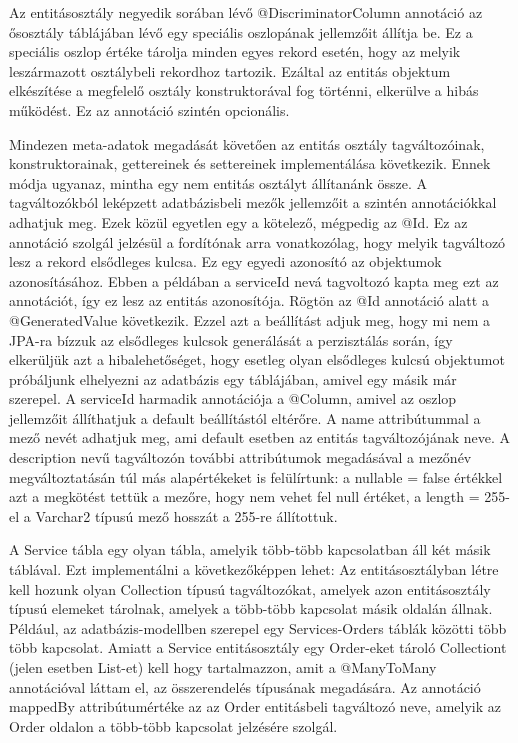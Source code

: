 \documentclass[centeredchapter]{thesis-ekf}
\theoremstyle{definition}
\theoremstyle{remark}
\begin{document}
Az entitásosztály negyedik sorában lévő @DiscriminatorColumn annotáció az ősosztály táblájában lévő egy speciális oszlopának jellemzőit állítja be. Ez a speciális oszlop értéke tárolja minden egyes rekord esetén, hogy az melyik leszármazott osztálybeli rekordhoz tartozik. Ezáltal az entitás objektum elkészítése a megfelelő osztály konstruktorával fog történni, elkerülve a hibás működést.
Ez az annotáció szintén opcionális.

Mindezen meta-adatok megadását követően az entitás osztály tagváltozóinak, konstruktorainak,  gettereinek és settereinek implementálása következik. Ennek módja ugyanaz, mintha egy nem entitás osztályt állítanánk össze. A tagváltozókból leképzett adatbázisbeli mezők jellemzőit a szintén annotációkkal adhatjuk meg. Ezek közül egyetlen egy a kötelező, mégpedig az @Id. Ez az annotáció szolgál jelzésül a fordítónak arra vonatkozólag, hogy melyik tagváltozó lesz a rekord elsődleges kulcsa. Ez egy egyedi azonosító az objektumok azonosításához. Ebben a példában a serviceId nevá tagvoltozó kapta meg ezt az annotációt, így ez lesz az entitás azonosítója. Rögtön az @Id annotáció alatt a @GeneratedValue következik. Ezzel azt a beállítást adjuk meg, hogy mi nem a JPA-ra bízzuk az elsődleges kulcsok generálását a perzisztálás során, így elkerüljük azt a hibalehetőséget, hogy esetleg olyan elsődleges kulcsú objektumot próbáljunk elhelyezni az adatbázis egy táblájában, amivel egy másik már szerepel. A serviceId harmadik annotációja a @Column, amivel az oszlop jellemzőit állíthatjuk a default beállítástól eltérőre. A name attribútummal a mező nevét adhatjuk meg, ami default esetben az entitás tagváltozójának neve. A description nevű tagváltozón további attribútumok megadásával a mezőnév megváltoztatásán túl más alapértékeket is felülírtunk: a nullable = false értékkel azt a megkötést tettük a mezőre, hogy nem vehet fel null értéket, a length = 255-el a Varchar2 típusú mező hosszát a 255-re állítottuk. 

A Service tábla egy olyan tábla, amelyik több-több kapcsolatban áll két másik táblával. Ezt implementálni a következőképpen lehet: Az entitásosztályban létre kell hozunk olyan Collection típusú tagváltozókat, amelyek azon entitásosztály típusú elemeket tárolnak, amelyek a több-több kapcsolat másik oldalán állnak. Például, az adatbázis-modellben szerepel egy Services-Orders táblák közötti több több kapcsolat. Amiatt a Service entitásosztály egy Order-eket tároló Collectiont (jelen esetben List-et) kell hogy tartalmazzon, amit a @ManyToMany annotációval láttam el, az összerendelés típusának megadására. Az annotáció mappedBy attribútumértéke az az Order entitásbeli tagváltozó neve, amelyik az Order oldalon a több-több kapcsolat jelzésére szolgál.
\end{document}
